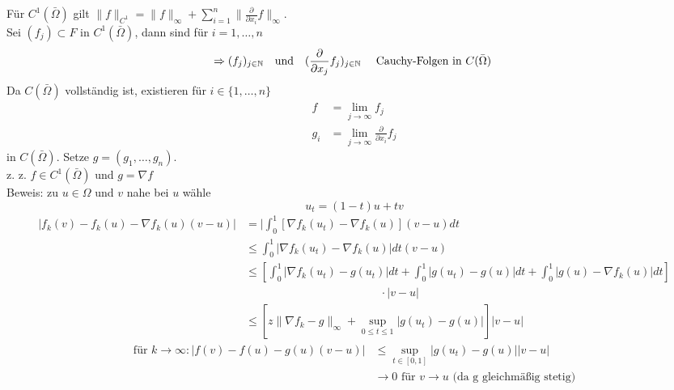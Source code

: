 \begin{beweis}
	Für $C^{1}(\bar \Omega)$ gilt $\| f \|_{C^{1}} = \| f \|_{\infty} + \sum_{i = 1}^{n}  \| \frac{\partial}{\partial x_{i}} f \|_{\infty}$. \\
	Sei $(f_{j}) \subset F$ in $C^{1}(\bar \Omega)$, dann sind für $i = 1, \dotsc, n $
		\[ \Rightarrow (f_{j})_{j \in \MdN} \quad \text{und} \quad (\frac{\partial}{\partial x_{j}} f_{j})_{j \in \MdN} \quad \text{ Cauchy-Folgen in } C(\bar \Omega) \]
	Da $C(\bar \Omega)$ vollständig ist, existieren für $i \in \{ 1, \dotsc, n \} $
		\begin{align*}
		 		f & = \lim_{j \rightarrow \infty} f_{j} \\
		 		g_{i} & = \lim_{j \rightarrow \infty} \frac{\partial}{\partial x_{i}} f_{j}
		\end{align*}
	in $C(\bar \Omega)$. Setze $g = (g_{1}, \dotsc, g_{n})$. \\
	
	z. z. $f \in C^{1}(\bar \Omega)$ und $g = \nabla f$ \\
	Beweis: zu $u \in \Omega$ und $v$ nahe bei $u$ wähle
		\[ u_{t} = (1 - t) u + t v \]
		\begin{align*}
		 	| f_{k}(v) - f_{k} (u) - \nabla f_{k}(u) (v - u) | & = | \int_{0}^{1} [ \nabla f_{k} (u_{t}) - \nabla f_{k} (u) ] (v - u) dt \\
		 		& \leq  \int_{0}^{1} | \nabla f_{k} (u_{t}) - \nabla f_{k} (u) | dt (v - u) \\
		 		& \leq \left[ \int_{0}^{1} | \nabla f_{k}(u_{t}) - g(u_{t}) | dt + \int_{0}^{1} | g(u_{t}) - g(u) | dt + \int_{0}^{1} | g(u) - \nabla f_{k}(u) | dt \right] \\
		 		&  \hspace{5cm} \cdot |v - u| \\
		 		& \leq \left[ z \| \nabla f_{k} - g \|_{\infty} + \sup_{0 \leq t \leq 1} | g(u_{t}) - g(u) | \right] |v - u|
 		\end{align*}
 		\begin{align*}
 		 	\text{für } k \rightarrow \infty: | f(v) - f(u) - g(u)(v - u) | & \leq \sup_{t \in [0, 1]} | g(u_{t}) - g(u) | |v - u| \\
 		 		& \rightarrow 0 \text{ für } v \rightarrow u \text{ (da g gleichmä{\ss}ig stetig)}
		\end{align*} 
\end{beweis}
	

